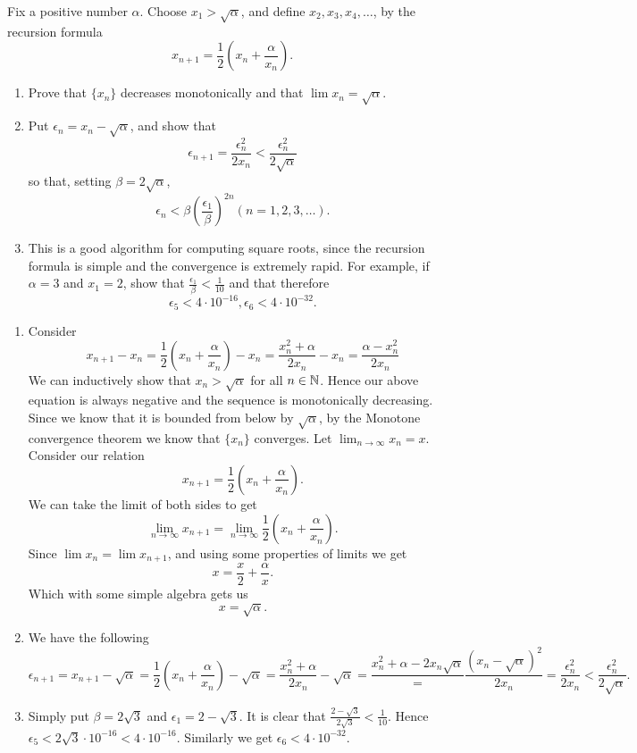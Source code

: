 \setcounter{problem}{15}
\begin{problem}
  Fix a positive number $\alpha$.
  Choose $x_1 > \sqrt{\alpha}$, and define $x_2, x_3, x_4, \ldots$, by the recursion formula
  \[x_{n + 1} = \frac{1}{2} (x_n + \frac{\alpha}{x_n}).\]
  \begin{enumerate}[label=(\alph*)]
    \item Prove that $\{x_n\}$ decreases monotonically and that $\lim x_n = \sqrt{\alpha}$.
    \item Put $\epsilon_n = x_n - \sqrt{\alpha}$, and show that
      \[\epsilon_{n + 1} = \frac{\epsilon_n^2}{2x_n} < \frac{\epsilon_n^2}{2\sqrt{\alpha}}\]
      so that, setting $\beta = 2\sqrt{\alpha}$,
      \[\epsilon_n < \beta (\frac{\epsilon_1}{\beta})^{2n}  (n = 1, 2, 3, \ldots).\]
    \item This is a good algorithm for computing square roots, since the recursion formula is simple and the convergence is extremely rapid.
      For example, if $\alpha = 3$ and $x_1 = 2$, show that $\frac{\epsilon_1}{\beta} < \frac{1}{10}$ and that therefore
      \[\epsilon_5 < 4 \cdot 10^{-16},  \epsilon_6 < 4 \cdot 10^{-32}.\]
  \end{enumerate}
\end{problem}

\begin{solution}
  \begin{enumerate}[label=(\alph*)]
    \item Consider
      \[x_{n + 1} - x_n = \frac{1}{2}(x_n + \frac{\alpha}{x_n}) - x_n = \frac{x_n^2 + \alpha}{2x_n} - x_n = \frac{\alpha - x_n^2}{2x_n}\]
      We can inductively show that $x_n > \sqrt{\alpha}$ for all $n \in \mathbb{N}$.
      Hence our above equation is always negative and the sequence is monotonically decreasing.
      Since we know that it is bounded from below by $\sqrt{\alpha}$, by the Monotone convergence theorem we know that $\{x_n\}$ converges.
      Let $\lim_{n\to\infty} x_n = x$.
      Consider our relation
      \[x_{n + 1} = \frac{1}{2} (x_n + \frac{\alpha}{x_n}).\]
      We can take the limit of both sides to get
      \[\lim_{n\to\infty} x_{n + 1} = \lim_{n\to\infty} \frac{1}{2} (x_n + \frac{\alpha}{x_n}).\]
      Since $\lim x_n = \lim x_{n + 1}$, and using some properties of limits we get
      \[x = \frac{x}{2} + \frac{\alpha}{x}.\]
      Which with some simple algebra gets us
      \[x = \sqrt{\alpha}.\]
    \item We have the following
      \[\epsilon_{n + 1} = x_{n + 1} - \sqrt{\alpha} = \frac{1}{2}(x_n + \frac{\alpha}{x_n}) - \sqrt{\alpha} = \frac{x_n^2 + \alpha}{2x_n} - \sqrt{\alpha} = \frac{x_n^2 + \alpha - 2x_n\sqrt{\alpha}} = \frac{(x_n - \sqrt{\alpha})^2}{2x_n} = \frac{\epsilon_n^2}{2x_n} < \frac{\epsilon_n^2}{2\sqrt{\alpha}}.\]
    \item Simply put $\beta = 2\sqrt{3}$ and $\epsilon_1 = 2 - \sqrt{3}$.
      It is clear that $\frac{2 - \sqrt{3}}{2\sqrt{3}} < \frac{1}{10}$.
      Hence $\epsilon_5 < 2\sqrt{3} \cdot 10^{-16} < 4 \cdot 10^{-16}.$
      Similarly we get $\epsilon_6 < 4 \cdot 10^{-32}.$
  \end{enumerate}
\end{solution}

